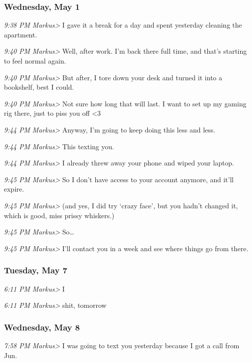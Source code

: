 {\subsubsection*{Wednesday, May 1}\label{wednesday-may-1}

\emph{9:38 PM Markus\textgreater{}} I gave it a break for a day and
spent yesterday cleaning the apartment.

\emph{9:40 PM Markus\textgreater{}} Well, after work. I'm back there
full time, and that's starting to feel normal again.

\emph{9:40 PM Markus\textgreater{}} But after, I tore down your desk and
turned it into a bookshelf, best I could.

\emph{9:40 PM Markus\textgreater{}} Not sure how long that will last. I
want to set up my gaming rig there, just to piss you off \textless{}3

\emph{9:44 PM Markus\textgreater{}} Anyway, I'm going to keep doing this
less and less.

\emph{9:44 PM Markus\textgreater{}} This texting you.

\emph{9:44 PM Markus\textgreater{}} I already threw away your phone and
wiped your laptop.

\emph{9:45 PM Markus\textgreater{}} So I don't have access to your
account anymore, and it'll expire.

\emph{9:45 PM Markus\textgreater{}} (and yes, I did try `crazy face',
but you hadn't changed it, which is good, miss prissy whiskers.)

\emph{9:45 PM Markus\textgreater{}} So\ldots{}

\emph{9:45 PM Markus\textgreater{}} I'll contact you in a week and see
where things go from there.

\subsubsection*{Tuesday, May 7}\label{tuesday-may-7}

\emph{6:11 PM Markus\textgreater{}} I

\emph{6:11 PM Markus\textgreater{}} shit, tomorrow

\subsubsection*{Wednesday, May 8}\label{wednesday-may-8}

\emph{7:58 PM Markus\textgreater{}} I was going to text you yesterday
because I got a call from Jun.

}

